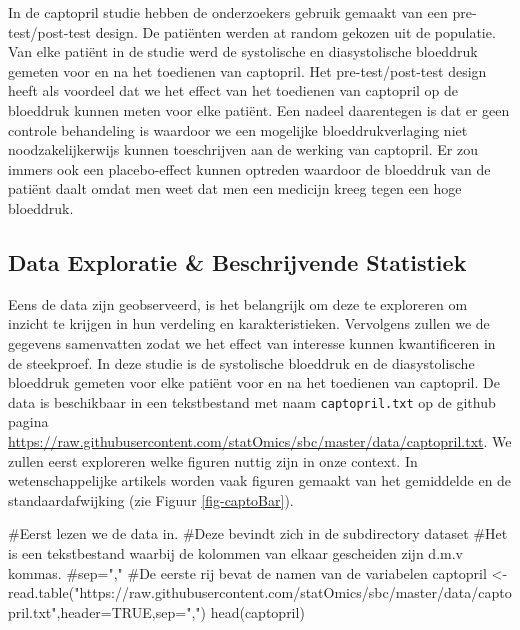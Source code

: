 \documentclass[
  dutch,
  letterpaper,
  12pt]{book}
\newenvironment{Shaded}{\begin{snugshade}}{\end{snugshade}}
\newcommand{\AttributeTok}[1]{\textcolor[rgb]{0.40,0.45,0.13}{#1}}
\newcommand{\CommentTok}[1]{\textcolor[rgb]{0.37,0.37,0.37}{#1}}
\newcommand{\ConstantTok}[1]{\textcolor[rgb]{0.56,0.35,0.01}{#1}}
\newcommand{\FunctionTok}[1]{\textcolor[rgb]{0.28,0.35,0.67}{#1}}
\newcommand{\NormalTok}[1]{\textcolor[rgb]{0.00,0.23,0.31}{#1}}
\newcommand{\OtherTok}[1]{\textcolor[rgb]{0.00,0.23,0.31}{#1}}
\newcommand{\StringTok}[1]{\textcolor[rgb]{0.13,0.47,0.30}{#1}}
\theoremstyle{definition}
\theoremstyle{definition}
\theoremstyle{definition}
\theoremstyle{remark}
\begin{document}
In de captopril studie hebben de onderzoekers gebruik gemaakt van een
pre-test/post-test design. De patiënten werden at random gekozen uit de
populatie. Van elke patiënt in de studie werd de systolische en
diasystolische bloeddruk gemeten voor en na het toedienen van captopril.
Het pre-test/post-test design heeft als voordeel dat we het effect van
het toedienen van captopril op de bloeddruk kunnen meten voor elke
patiënt. Een nadeel daarentegen is dat er geen controle behandeling is
waardoor we een mogelijke bloeddrukverlaging niet noodzakelijkerwijs
kunnen toeschrijven aan de werking van captopril. Er zou immers ook een
placebo-effect kunnen optreden waardoor de bloeddruk van de patiënt
daalt omdat men weet dat men een medicijn kreeg tegen een hoge
bloeddruk.

\subsection{Data Exploratie \& Beschrijvende
Statistiek}\label{data-exploratie-beschrijvende-statistiek}

Eens de data zijn geobserveerd, is het belangrijk om deze te exploreren
om inzicht te krijgen in hun verdeling en karakteristieken. Vervolgens
zullen we de gegevens samenvatten zodat we het effect van interesse
kunnen kwantificeren in de steekproef. In deze studie is de systolische
bloeddruk en de diasystolische bloeddruk gemeten voor elke patiënt voor
en na het toedienen van captopril. De data is beschikbaar in een
tekstbestand met naam \texttt{captopril.txt} op de github pagina
\url{https://raw.githubusercontent.com/statOmics/sbc/master/data/captopril.txt}.
We zullen eerst exploreren welke figuren nuttig zijn in onze context. In
wetenschappelijke artikels worden vaak figuren gemaakt van het
gemiddelde en de standaardafwijking (zie Figuur \ref{fig-captoBar}).

\begin{Shaded}
\begin{Highlighting}[]
\CommentTok{\#Eerst lezen we de data in.}
\CommentTok{\#Deze bevindt zich in de subdirectory dataset}
\CommentTok{\#Het is een tekstbestand waarbij de kolommen van elkaar gescheiden zijn d.m.v kommas.}
\CommentTok{\#sep=","}
\CommentTok{\#De eerste rij bevat de namen van de variabelen}
\NormalTok{captopril }\OtherTok{\textless{}{-}} \FunctionTok{read.table}\NormalTok{(}\StringTok{"https://raw.githubusercontent.com/statOmics/sbc/master/data/captopril.txt"}\NormalTok{,}\AttributeTok{header=}\ConstantTok{TRUE}\NormalTok{,}\AttributeTok{sep=}\StringTok{","}\NormalTok{)}
\FunctionTok{head}\NormalTok{(captopril)}
\end{Highlighting}
\end{Shaded}
\end{document}
